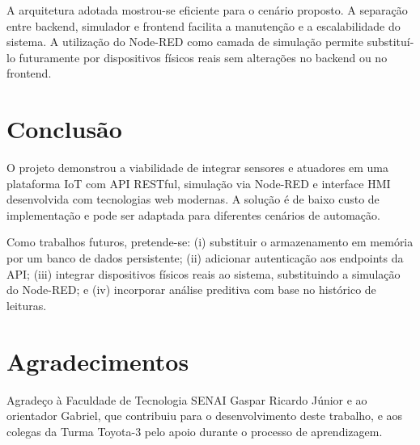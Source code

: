 \documentclass[12pt]{unisenaiclass}
\begin{document}
A arquitetura adotada mostrou-se eficiente para o cenário proposto. A separação entre backend, simulador e frontend facilita a manutenção e a escalabilidade do sistema. A utilização do Node-RED como camada de simulação permite substituí-lo futuramente por dispositivos físicos reais sem alterações no backend ou no frontend.

\section{Conclusão}

O projeto demonstrou a viabilidade de integrar sensores e atuadores em uma plataforma IoT com API RESTful, simulação via Node-RED e interface HMI desenvolvida com tecnologias web modernas. A solução é de baixo custo de implementação e pode ser adaptada para diferentes cenários de automação.

Como trabalhos futuros, pretende-se: (i) substituir o armazenamento em memória por um banco de dados persistente; (ii) adicionar autenticação aos endpoints da API; (iii) integrar dispositivos físicos reais ao sistema, substituindo a simulação do Node-RED; e (iv) incorporar análise preditiva com base no histórico de leituras.

\section*{Agradecimentos}

Agradeço à Faculdade de Tecnologia SENAI Gaspar Ricardo Júnior e ao orientador Gabriel, que contribuiu para o desenvolvimento deste trabalho, e aos colegas da Turma Toyota-3 pelo apoio durante o processo de aprendizagem.

\printbibliography
\end{document}
